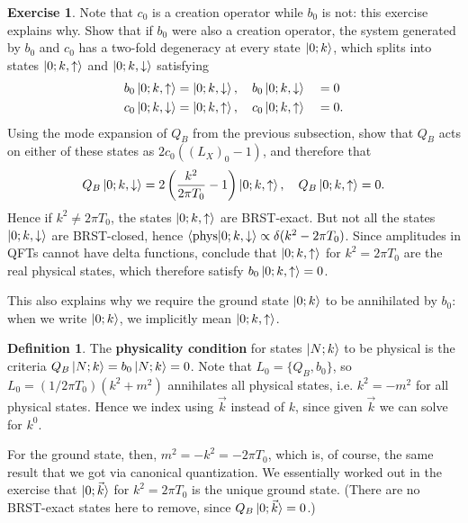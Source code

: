 \documentclass{report}
\theoremstyle{plain}
\theoremstyle{definition}
\newtheorem{definition}[theorem]{Definition}
\newtheorem{exercise}{Exercise}[section]
\theoremstyle{remark}
\begin{document}
\begin{exercise}
  Note that $c_0$ is a creation operator while $b_0$ is not: this
  exercise explains why. Show that if $b_0$ were also a creation
  operator, the system generated by $b_0$ and $c_0$ has a two-fold
  degeneracy at every state $\ket{0; k}$, which splits into states
  $\ket{0; k, \uparrow}$ and $\ket{0; k, \downarrow}$ satisfying
  \begin{alignat*}{2}
    b_0 \ket{0; k, \uparrow} &= \ket{0; k, \downarrow}, \quad b_0 \ket{0; k, \downarrow} &&= 0 \\
    c_0 \ket{0; k, \downarrow} &= \ket{0; k, \uparrow}, \quad c_0 \ket{0; k, \uparrow} &&= 0.
  \end{alignat*}
  Using the mode expansion of $Q_B$ from the previous subsection, show
  that $Q_B$ acts on either of these states as $2c_0 ((L_X)_0 - 1)$,
  and therefore that
  \[ Q_B\ket{0; k, \downarrow} = 2\left(\frac{k^2}{2\pi T_0} - 1\right) \ket{0; k, \uparrow}, \quad Q_B\ket{0; k, \uparrow} = 0. \]
  Hence if $k^2 \neq 2\pi T_0$, the states $\ket{0; k, \uparrow}$ are
  BRST-exact. But not all the states $\ket{0; k, \downarrow}$ are
  BRST-closed, hence $\braket{\text{phys} | 0;k,\downarrow} \propto
  \delta(k^2 - 2\pi T_0)$. Since amplitudes in QFTs cannot have delta
  functions, conclude that $\ket{0; k, \uparrow}$ for $k^2 = 2\pi T_0$
  are the real physical states, which therefore satisfy $b_0\ket{0; k,
    \uparrow} = 0$.
\end{exercise}

This also explains why we require the ground state $\ket{0; k}$ to be
annihilated by $b_0$: when we write $\ket{0; k}$, we implicitly mean
$\ket{0; k, \uparrow}$.

\begin{definition}
  The {\bf physicality condition} for states $\ket{N; k}$ to be
  physical is the criteria $Q_B\ket{N; k} = b_0\ket{N; k} = 0$. Note
  that $L_0 = \{Q_B, b_0\}$, so $L_0 = (1/2\pi T_0)(k^2 + m^2)$
  annihilates all physical states, i.e. $k^2 = -m^2$ for all physical
  states. Hence we index using $\vec{k}$ instead of $k$, since given
  $\vec{k}$ we can solve for $k^0$.
\end{definition}

For the ground state, then, $m^2 = -k^2 = -2\pi T_0$, which is, of
course, the same result that we got via canonical quantization. We
essentially worked out in the exercise that $\ket{0; \vec{k}}$ for
$k^2 = 2\pi T_0$ is the unique ground state. (There are no BRST-exact
states here to remove, since $Q_B\ket{0; \vec{k}} = 0$.)
\end{document}
